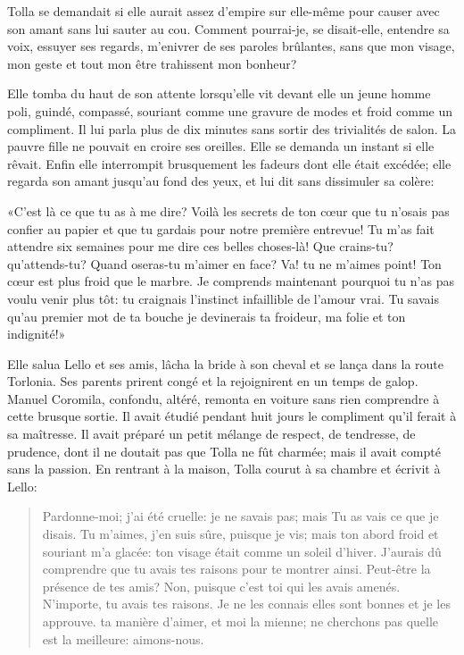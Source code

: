 Tolla se demandait si elle aurait assez d'empire sur elle-même pour
causer avec son amant sans lui sauter au cou. Comment pourrai-je, se
disait-elle, entendre sa voix, essuyer ses regards, m'enivrer de ses
paroles brûlantes, sans que mon visage, mon geste et tout mon être
trahissent mon bonheur?

Elle tomba du haut de son attente lorsqu'elle vit devant elle un jeune
homme poli, guindé, compassé, souriant comme une gravure de modes et
froid comme un compliment. Il lui parla plus de dix minutes sans sortir
des trivialités de salon. La pauvre fille ne pouvait en croire ses
oreilles. Elle se demanda un instant si elle rêvait. Enfin elle
interrompit brusquement les fadeurs dont elle était excédée; elle
regarda son amant jusqu'au fond des yeux, et lui dit sans dissimuler sa
colère:

«C'est là ce que tu as à me dire? Voilà les secrets de ton cœur que tu
n'osais pas confier au papier et que tu gardais pour notre première
entrevue! Tu m'as fait attendre six semaines pour me dire ces belles
choses-là! Que crains-tu? qu'attends-tu? Quand oseras-tu m'aimer en
face? Va! tu ne m'aimes point! Ton cœur est plus froid que le marbre. Je
comprends maintenant pourquoi tu n'as pas voulu venir plus tôt: tu
craignais l'instinct infaillible de l'amour vrai. Tu savais qu'au
premier mot de ta bouche je devinerais ta froideur, ma folie et ton
indignité!»

Elle salua Lello et ses amis, lâcha la bride à son cheval et se lança
dans la route Torlonia. Ses parents prirent congé et la rejoignirent en
un temps de galop. Manuel Coromila, confondu, altéré, remonta en voiture
sans rien comprendre à cette brusque sortie. Il avait étudié pendant
huit jours le compliment qu'il ferait à sa maîtresse. Il avait préparé
un petit mélange de respect, de tendresse, de prudence, dont il ne
doutait pas que Tolla ne fût charmée; mais il avait compté sans la
passion. En rentrant à la maison, Tolla courut à sa chambre et écrivit à
Lello:

\begin{quote}
Pardonne-moi; j'ai été cruelle: je ne savais pas; mais Tu as vais ce que
je disais. Tu m'aimes, j'en suis sûre, puisque je vis; mais ton abord
froid et souriant m'a glacée: ton visage était comme un soleil d'hiver.
J'aurais dû comprendre que tu avais tes raisons pour te montrer ainsi.
Peut-être la présence de tes amis? Non, puisque c'est toi qui les avais
amenés. N'importe, tu avais tes raisons. Je ne les connais elles sont
bonnes et je les approuve. ta manière d'aimer, et moi la mienne; ne
cherchons pas quelle est la meilleure: aimons-nous.
\end{quote}

